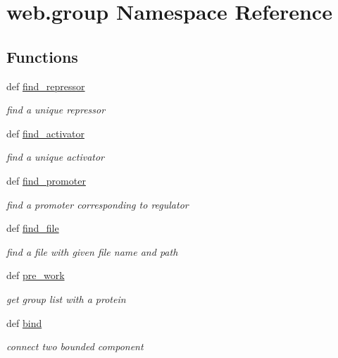 \hypertarget{namespaceweb_1_1group}{\section{web.\-group Namespace Reference}
\label{namespaceweb_1_1group}
}
\subsection*{Functions}
\begin{DoxyCompactItemize}
\item 
def \hyperlink{namespaceweb_1_1group_a7a76edcad82bd03a61d1decdc6f046f4}{find\-\_\-repressor}
\begin{DoxyCompactList}\small\item\em find a unique repressor \end{DoxyCompactList}\item 
def \hyperlink{namespaceweb_1_1group_a2eb7a3d5ff9a89313b7739f0bd3b3a9e}{find\-\_\-activator}
\begin{DoxyCompactList}\small\item\em find a unique activator \end{DoxyCompactList}\item 
def \hyperlink{namespaceweb_1_1group_a090d26034ffbe7cc76af5d46820d2286}{find\-\_\-promoter}
\begin{DoxyCompactList}\small\item\em find a promoter corresponding to regulator \end{DoxyCompactList}\item 
def \hyperlink{namespaceweb_1_1group_a2b259265e97817bd2980fdf5eab3673a}{find\-\_\-file}
\begin{DoxyCompactList}\small\item\em find a file with given file name and path \end{DoxyCompactList}\item 
def \hyperlink{namespaceweb_1_1group_a3c1931bd9782fdfbbc42e27cf9ec0b7e}{pre\-\_\-work}
\begin{DoxyCompactList}\small\item\em get group list with a protein \end{DoxyCompactList}\item 
def \hyperlink{namespaceweb_1_1group_a203c02195af59d2e98d588c0bd0781a2}{bind}
\begin{DoxyCompactList}\small\item\em connect two bounded component \end{DoxyCompactList}\item 

\end{DoxyCompactItemize}
